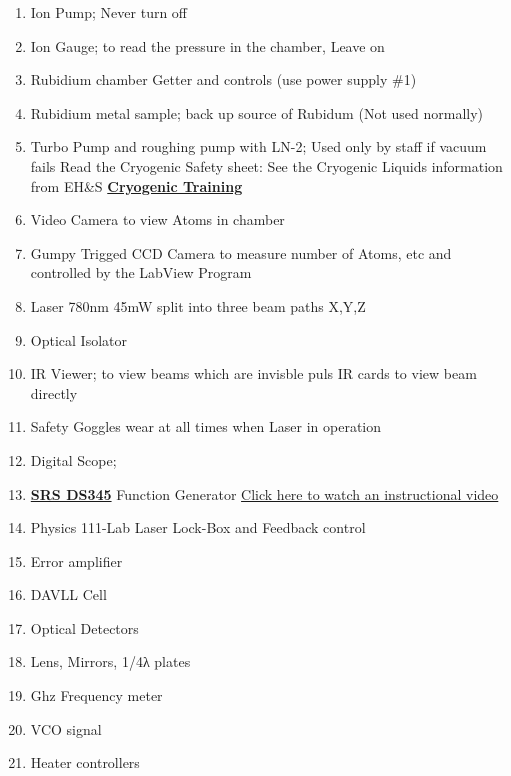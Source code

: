\documentclass{../lab}
\begin{document}
\begin{enumerate}
    \item Ion Pump; Never turn off

    \item Ion Gauge; to read the pressure in the chamber, Leave on

    \item Rubidium chamber Getter and controls (use power supply \#1)

    \item Rubidium metal sample; back up source of Rubidum (Not used normally)

    \item Turbo Pump and roughing pump with LN-2; Used only by staff if vacuum fails Read the Cryogenic Safety sheet: See the Cryogenic Liquids information from EH\&S \href{http://experimentationlab.berkeley.edu/sites/default/files/SHE/77cryogenic.pdf}{\textbf{Cryogenic Training}}

    \item Video Camera to view Atoms in chamber

    \item Gumpy Trigged CCD Camera to measure number of Atoms, etc and controlled by the LabView Program

    \item Laser 780nm 45mW split into three beam paths X,Y,Z

    \item Optical Isolator

    \item IR Viewer; to view beams which are invisble puls IR cards to view beam directly

    \item Safety Goggles wear at all times when Laser in operation

    \item Digital Scope;

    \item \href{http://physics111.lib.berkeley.edu/Physics111/Equipment_Manuals/JOS/DS345m.pdf}{\textbf{SRS DS345}} Function Generator \href{https://youtu.be/PrM8DHFOFS0}{Click here to watch an instructional video}

    \item Physics 111-Lab Laser Lock-Box and Feedback control

    \item Error amplifier

    \item DAVLL Cell

    \item Optical Detectors

    \item Lens, Mirrors, 1/4λ plates

    \item Ghz Frequency meter

    \item VCO signal

    \item Heater controllers
\end{enumerate}
\end{document}
